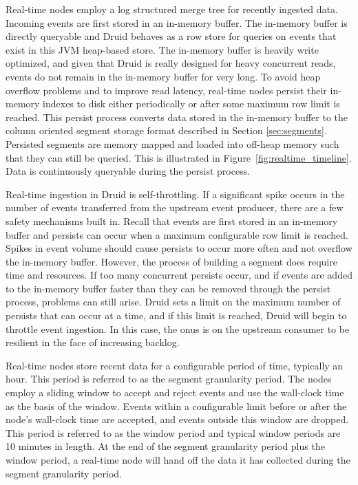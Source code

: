 \documentclass{vldb}
\begin{document}
Real-time nodes employ a log structured merge tree\cite{o1996log} for recently
ingested data. Incoming events are first stored in an in-memory buffer. The
in-memory buffer is directly queryable and Druid behaves as a row store for
queries on events that exist in this JVM heap-based store. The in-memory buffer
is heavily write optimized, and given that Druid is really designed for heavy
concurrent reads, events do not remain in the in-memory buffer for very long.
To avoid heap overflow problems and to improve read latency, real-time nodes
persist their in-memory indexes to disk either periodically or after some
maximum row limit is reached. This persist process converts data stored in the
in-memory buffer to the column oriented segment storage format described in
Section \ref{sec:segments}.  Persisted segments are memory mapped and loaded
into off-heap memory such that they can still be queried. This is illustrated
in Figure~\ref{fig:realtime_timeline}. Data is continuously queryable during
the persist process.

Real-time ingestion in Druid is self-throttling. If a significant spike occurs
in the number of events transferred from the upstream event producer, there are
a few safety mechanisms built in. Recall that events are first stored in an
in-memory buffer and persists can occur when a maximum configurable row limit
is reached. Spikes in event volume should cause persists to occur more often
and not overflow the in-memory buffer. However, the process of building a
segment does require time and resources. If too many concurrent persists occur,
and if events are added to the in-memory buffer faster than they can be removed
through the persist process, problems can still arise. Druid sets a limit on
the maximum number of persists that can occur at a time, and if this limit is
reached, Druid will begin to throttle event ingestion. In this case, the onus
is on the upstream consumer to be resilient in the face of increasing backlog.

Real-time nodes store recent data for a configurable period of time, typically
an hour. This period is referred to as the segment granularity period. The
nodes employ a sliding window to accept and reject events and use the
wall-clock time as the basis of the window. Events within a configurable limit
before or after the node’s wall-clock time are accepted, and events outside
this window are dropped. This period is referred to as the window period and
typical window periods are 10 minutes in length. At the end of the segment
granularity period plus the window period, a real-time node will hand off the
data it has collected during the segment granularity period. 
\end{document}
